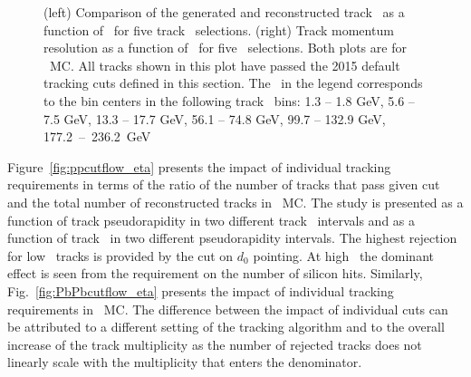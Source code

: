 \begin{figure}
\caption{(left) Comparison of the generated and reconstructed track \pt\ as a function of \etatrktruth\ for 
five track \pttrktruth\ selections. 
(right) Track momentum resolution as a function of \etatrktruth\ for five \pttrktruth\ selections.
Both plots are for \pp\ MC.  
All tracks shown in this plot have passed the 2015 default tracking cuts defined in this section. The \pt\ in the legend corresponds to the bin centers in the following track \pt\ bins: 1.3 -- 1.8 GeV, 5.6 -- 7.5 GeV, 13.3 -- 17.7 GeV, 56.1 -- 74.8 GeV, 99.7 -- 132.9 GeV, \mbox{177.2 -- 236.2 GeV}
 }
\label{fig:momres_pp}
\end{figure}



Figure~\ref{fig:ppcutflow_eta} presents the impact of individual tracking requirements in terms of the ratio of the number of tracks that pass given cut and the total number of reconstructed tracks in \pp\ MC. The study is presented as a function of track pseudorapidity in two different track \pT\ intervals and as a function of track \pT\ in two different pseudorapidity intervals. The highest rejection for low \pT\ tracks is provided by the cut on $d_{0}$ pointing. At high \pT\, the dominant effect is seen from the requirement on the number of silicon hits. Similarly, Fig.~\ref{fig:PbPbcutflow_eta} presents the impact of individual tracking requirements in \PbPb\ MC. The difference between the impact of individual cuts can be attributed to a different setting of the tracking algorithm and to the overall increase of the track multiplicity as the number of rejected tracks does not linearly scale with the multiplicity that enters the denominator.       

